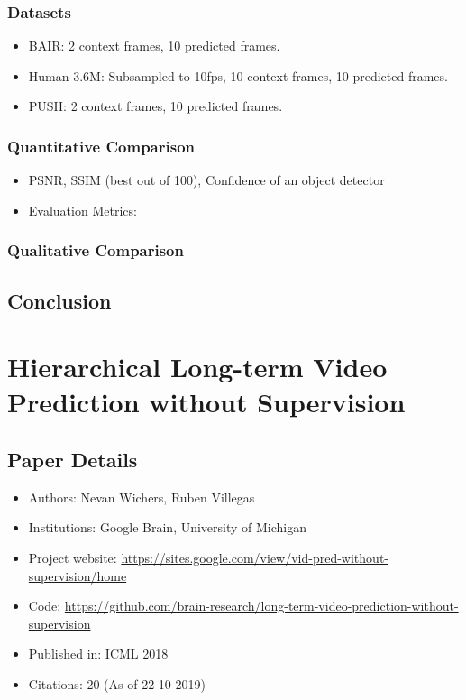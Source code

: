 \documentclass{article}
\begin{document}
    \subsubsection{Datasets}\label{subsubsec:Stochastic_Variational_Video_Prediction_(SV2P):datasets}
    \begin{itemize}
        \item BAIR: 2 context frames, 10 predicted frames.
        \item Human 3.6M: Subsampled to 10fps, 10 context frames, 10 predicted frames.
        \item PUSH: 2 context frames, 10 predicted frames.
    \end{itemize}

    \subsubsection{Quantitative Comparison}\label{subsubsec:Stochastic_Variational_Video_Prediction_(SV2P):quantitative-comparison}
    \begin{itemize}
        \item PSNR, SSIM (best out of 100), Confidence of an object detector
        \item Evaluation Metrics:
    \end{itemize}

    \subsubsection{Qualitative Comparison}\label{subsubsec:Stochastic_Variational_Video_Prediction_(SV2P):qualitative-comparison}

    \subsection{Conclusion}\label{subsec:Stochastic_Variational_Video_Prediction_(SV2P):conclusion}
    \newpage


    \section{Hierarchical Long-term Video Prediction without Supervision}\label{sec:Hierarchical_Long_term_Video_Prediction_without_Supervision}
    \subsection*{Paper Details}
    \begin{itemize}
        \item Authors: Nevan Wichers, Ruben Villegas
        \item Institutions: Google Brain, University of Michigan
        \item Project website: \url{https://sites.google.com/view/vid-pred-without-supervision/home}
        \item Code: \url{https://github.com/brain-research/long-term-video-prediction-without-supervision}
        \item Published in: ICML 2018
        \item Citations: 20 (As of 22-10-2019)
    \end{itemize}
\end{document}

